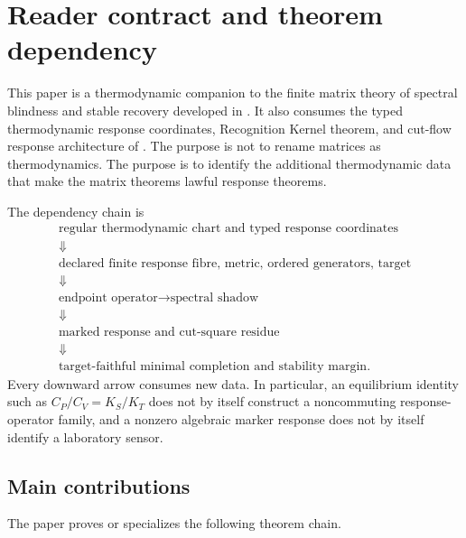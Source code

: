 \section{Reader contract and theorem dependency}

This paper is a thermodynamic companion to the finite matrix theory of spectral blindness and stable recovery developed in \cite{dabasSpectralOne,dabasSpectralTwo}. It also consumes the typed thermodynamic response coordinates, Recognition Kernel theorem, and cut-flow response architecture of \cite{dabasThermoRecognition}. The purpose is not to rename matrices as thermodynamics. The purpose is to identify the additional thermodynamic data that make the matrix theorems lawful response theorems.

The dependency chain is
\[
\begin{gathered}
\text{regular thermodynamic chart and typed response coordinates}
\\
\Downarrow
\\
\text{declared finite response fibre, metric, ordered generators, target}
\\
\Downarrow
\\
\text{endpoint operator}\longrightarrow\text{spectral shadow}
\\
\Downarrow
\\
\text{marked response and cut-square residue}
\\
\Downarrow
\\
\text{target-faithful minimal completion and stability margin}.
\end{gathered}
\]
Every downward arrow consumes new data. In particular, an equilibrium identity such as $C_P/C_V=K_S/K_T$ does not by itself construct a noncommuting response-operator family, and a nonzero algebraic marker response does not by itself identify a laboratory sensor.

\subsection{Main contributions}

The paper proves or specializes the following theorem chain.

